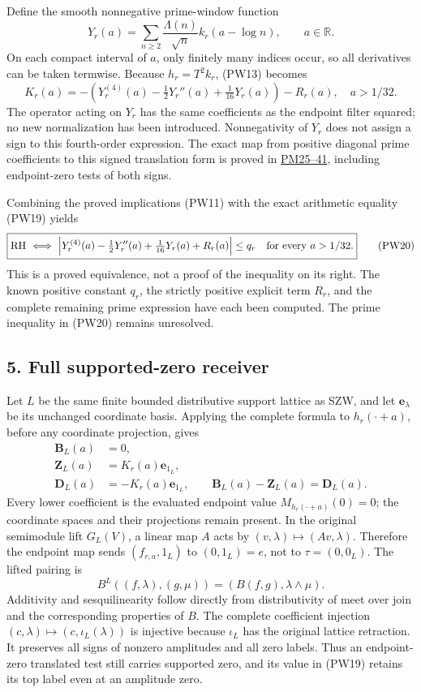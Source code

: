 \documentclass[
  10pt,
  a4paper,
]{article}
\begin{document}
Define the smooth nonnegative prime-window function \[
 Y_r(a)=\sum_{n\ge2}\frac{\Lambda(n)}{\sqrt n}k_r(a-\log n),
 \qquad a\in\mathbb R.
\tag{PW18}
\] On each compact interval of \(a\), only finitely many indices occur,
so all derivatives can be taken termwise. Because \(h_r=T^2k_r\), (PW13)
becomes \[
 \boxed{K_r(a)=-\left(Y_r^{(4)}(a)-\tfrac12Y_r''(a)
                       +\tfrac1{16}Y_r(a)\right)-R_r(a),\quad a>1/32.}
\tag{PW19}
\] The operator acting on \(Y_r\) has the same coefficients as the
endpoint filter squared; no new normalization has been introduced.
Nonnegativity of \(Y_r\) does not assign a sign to this fourth-order
expression. The exact map from positive diagonal prime coefficients to
this signed translation form is proved in
\href{PRIME_PROJECTOR_MOBIUS_DERIVATION.md}{PM25--41}, including
endpoint-zero tests of both signs.

Combining the proved implications (PW11) with the exact arithmetic
equality (PW19) yields \[
\boxed{\mathrm{RH}\ \Longleftrightarrow\
 \left|Y_r^{(4)}(a)-\tfrac12Y_r''(a)+\tfrac1{16}Y_r(a)+R_r(a)\right|
 \le q_r\quad\hbox{for every }a>1/32.}
\tag{PW20}
\] This is a proved equivalence, not a proof of the inequality on its
right. The known positive constant \(q_r\), the strictly positive
explicit term \(R_r\), and the complete remaining prime expression have
each been computed. The prime inequality in (PW20) remains unresolved.

\subsection{5. Full supported-zero
receiver}\label{full-supported-zero-receiver}

Let \(L\) be the same finite bounded distributive support lattice as
SZW, and let \(\mathbf e_\lambda\) be its unchanged coordinate basis.
Applying the complete formula to \(h_r(\cdot+a)\), before any coordinate
projection, gives \[
\begin{split}
 \boldsymbol B_L(a)&=0,\\
 \boldsymbol Z_L(a)&=K_r(a)\mathbf e_{1_L},\\
 \boldsymbol D_L(a)&=-K_r(a)\mathbf e_{1_L},\qquad
 \boldsymbol B_L(a)-\boldsymbol Z_L(a)=\boldsymbol D_L(a).
\end{split}
\tag{PW21}
\] Every lower coefficient is the evaluated endpoint value
\(M_{h_r(\cdot+a)}(0)=0\); the coordinate spaces and their projections
remain present. In the original semimodule lift \(G_L(V)\), a linear map
\(A\) acts by \((v,\lambda)\mapsto(Av,\lambda)\). Therefore the endpoint
map sends \((f_{r,a},1_L)\) to \((0,1_L)=e\), not to \(\tau=(0,0_L)\).
The lifted pairing is \[
 B^L((f,\lambda),(g,\mu))=(B(f,g),\lambda\wedge\mu).
\tag{PW22}
\] Additivity and sesquilinearity follow directly from distributivity of
meet over join and the corresponding properties of \(B\). The complete
coefficient injection \((c,\lambda)\mapsto(c,\iota_L(\lambda))\) is
injective because \(\iota_L\) has the original lattice retraction. It
preserves all signs of nonzero amplitudes and all zero labels. Thus an
endpoint-zero translated test still carries supported zero, and its
value in (PW19) retains its top label even at an amplitude zero.
\end{document}
